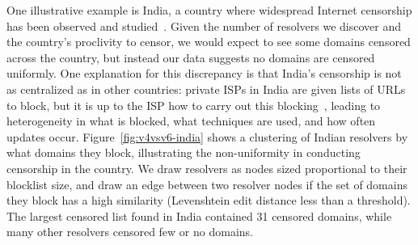One illustrative example is India, a country where widespread Internet censorship has
been observed and studied~\cite{singh2020india,Yadav2018a}. Given the number
of resolvers we discover and the country's proclivity to censor, we would expect to see
some domains censored across the country, but instead our data suggests no
domains are censored uniformly. One explanation for this discrepancy is that
India's censorship is not as centralized as in other countries: private ISPs in
India are given lists of URLs to block, but it is up to the ISP how to carry out
this blocking~\cite{Gosain2017a}, leading to heterogeneity in what is blocked,
what techniques are used, and how often updates occur.  Figure~\ref{fig:v4vsv6-india}
shows a clustering of Indian resolvers by what domains they block, illustrating the non-uniformity in
conducting censorship in the country. We draw resolvers as nodes sized proportional
to their blocklist size, and draw an edge between two resolver
nodes if the set of domains they block has a high similarity (Levenshtein edit
distance less than a threshold). The largest censored list found in India contained 31
censored domains, while many other resolvers censored few or no domains.


\FigIndiaCluster
\fi


